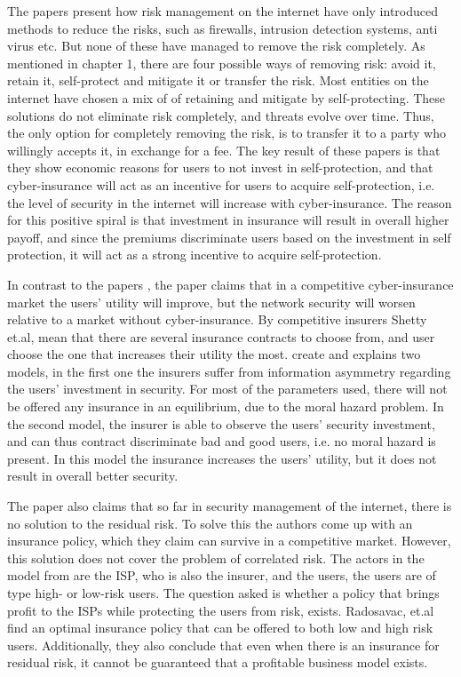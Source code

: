 The papers \cite{bolot2008cyber, bolot2008new} present how risk management on the internet have only introduced methods to reduce the risks, such as firewalls, intrusion detection systems, anti virus etc. But none of these have managed to remove the risk completely. As mentioned in chapter 1, there are four possible ways of removing risk: avoid it, retain it, self-protect and mitigate it or transfer the risk. Most entities on the internet have chosen a mix of of retaining and mitigate by self-protecting. These solutions do not eliminate risk completely, and threats evolve over time. Thus, the only option for completely removing the risk, is to transfer it to a party who willingly accepts it, in exchange for a fee. 
The key result of these papers is that they show economic reasons for users to not invest in self-protection, and that cyber-insurance will act as an incentive for users to acquire self-protection, i.e. the level of security in the internet will increase with cyber-insurance. The reason for this positive spiral is that investment in insurance will result in overall higher payoff, and since the premiums discriminate users based on the investment in self protection, it will act as a strong incentive to acquire self-protection. 

In contrast to the papers \cite{bolot2008cyber, bolot2008new}, the paper \cite{shetty2010competitive} claims that in a competitive cyber-insurance market the users' utility will improve, but the network security will worsen relative to a market without cyber-insurance. By competitive insurers Shetty et.al, mean that there are several insurance contracts to choose from, and user choose the one that increases their utility the most.
\cite{shetty2010competitive} create and explains two models, in the first one the insurers suffer from information asymmetry regarding the users' investment in security. For most of the parameters used, there will not be offered any insurance in an equilibrium, due to the moral hazard problem. In the second model, the insurer is able to observe the users' security investment, and can thus contract discriminate bad and good users, i.e. no moral hazard is present. In this model the insurance increases the users' utility, but it does not result in overall better security.  

The paper \cite{radosavac2008using} also claims that so far in security management of the internet, there is no solution to the residual risk. To solve this the authors come up with an insurance policy, which they claim can survive in a competitive market. However, this solution does not cover the problem of correlated risk.
The actors in the model from \cite{radosavac2008using} are the ISP, who is also the insurer, and the users, the users are of type high- or low-risk users. The question asked is whether a policy that brings profit to the ISPs while protecting the users from risk, exists. Radosavac, et.al find an optimal insurance policy that can be offered to both low and high risk users. Additionally, they also conclude that even when there is an insurance for residual risk, it cannot be guaranteed that a profitable business model exists. 

